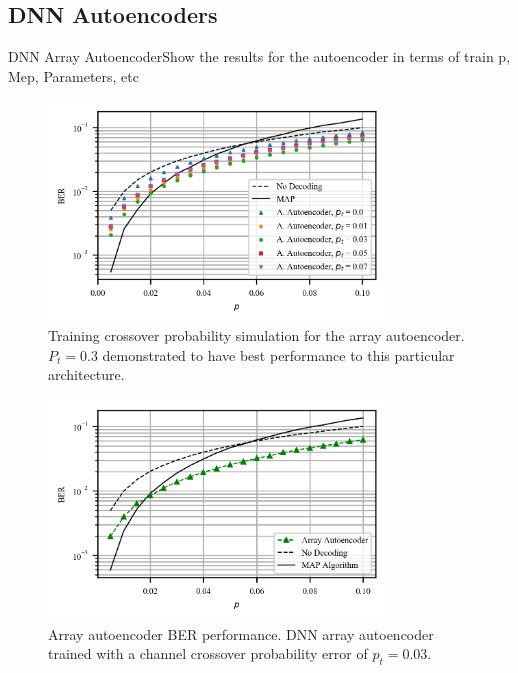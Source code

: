 \documentclass{beamer}
\begin{document}
\subsection{DNN Autoencoders}
\begin{frame}[allowframebreaks]{DNN Array Autoencoder}{Show the results for the autoencoder in terms of train p, Mep, Parameters, etc}

\begin{figure}[!ht]
  \centering
    \includegraphics[width=0.8\textwidth]{images/MAP_AutoencoderArray_Mep_65536_64_128_256_p_analysis}
    \caption{Training crossover probability simulation for the array autoencoder. $P_t=0.3$ demonstrated to have best performance to this particular architecture.}\label{fig:parrayanalysis}
\end{figure}


\begin{figure}[!ht]
  \centering
    \includegraphics[width=0.8\textwidth]{images/AutoencoderArray_Mep_65536_ptrain_003_logcosh}
    \caption{Array autoencoder BER performance. DNN array autoencoder trained with a channel crossover probability error of $p_t=0.03$.}\label{fig:arrayautoencoder}
\end{figure}

\end{frame}
\end{document}
